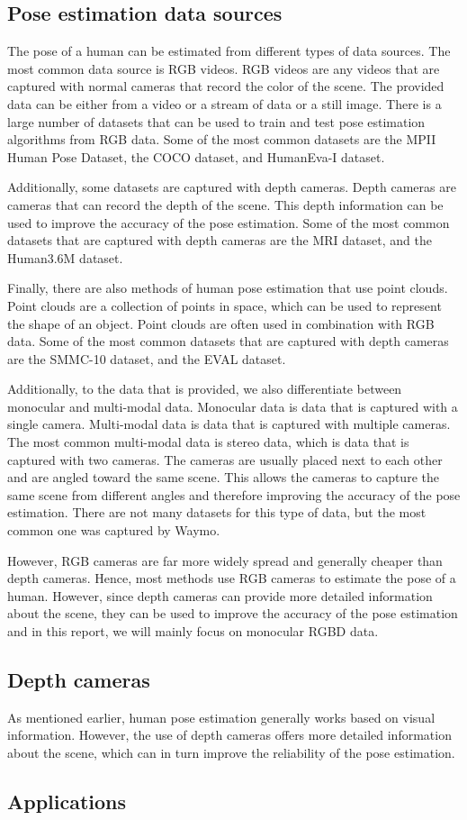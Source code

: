 \subsection{Pose estimation data sources}

The pose of a human can be estimated from different types of data sources. The most common data source is RGB videos. RGB videos are any videos that are captured with normal cameras that record the color of the scene. The provided data can be either from a video or a stream of data or a still image. There is a large number of datasets that can be used to train and test pose estimation algorithms from RGB data. Some of the most common datasets are the MPII Human Pose Dataset\cite{MPII}, the COCO dataset\cite{Coco}, and HumanEva-I dataset\cite{HumanEva-I}.

Additionally, some datasets are captured with depth cameras. Depth cameras are cameras that can record the depth of the scene. This depth information can be used to improve the accuracy of the pose estimation. Some of the most common datasets that are captured with depth cameras are the MRI dataset\cite{mRI}, and the Human3.6M dataset\cite{h36m_pami}.

Finally, there are also methods of human pose estimation that use point clouds. Point clouds are a collection of points in space, which can be used to represent the shape of an object. Point clouds are often used in combination with RGB data. Some of the most common datasets that are captured with depth cameras are the SMMC-10 dataset\cite{SMMC10}, and the EVAL dataset\cite{EVAL}.

Additionally, to the data that is provided, we also differentiate between monocular and multi-modal data. Monocular data is data that is captured with a single camera. Multi-modal data is data that is captured with multiple cameras. The most common multi-modal data is stereo data, which is data that is captured with two cameras. The cameras are usually placed next to each other and are angled toward the same scene. This allows the cameras to capture the same scene from different angles and therefore improving the accuracy of the pose estimation. There are not many datasets for this type of data, but the most common one was captured by Waymo\cite{Waymo}.

However, RGB cameras are far more widely spread and generally cheaper than depth cameras. Hence, most methods use RGB cameras to estimate the pose of a human. However, since depth cameras can provide more detailed information about the scene, they can be used to improve the accuracy of the pose estimation and in this report, we will mainly focus on monocular RGBD data.

\subsection{Depth cameras}

As mentioned earlier, human pose estimation generally works based on visual information. However, the use of depth cameras offers more detailed information about the scene, which can in turn improve the reliability of the pose estimation.

\subsection{Applications}


